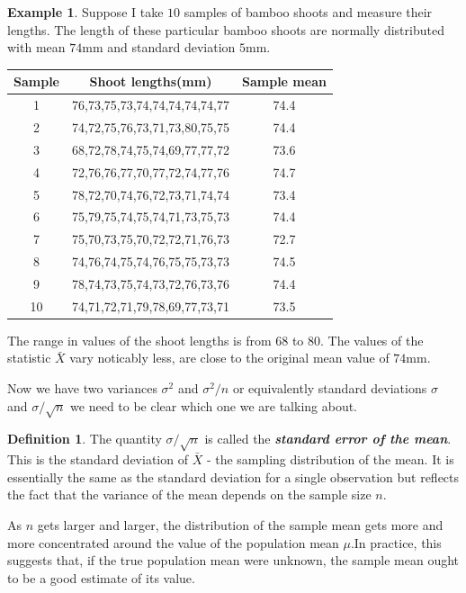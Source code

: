 \documentclass[
]{book}
\theoremstyle{definition}
\newtheorem{definition}{Definition}[chapter]
\theoremstyle{definition}
\newtheorem{example}{Example}[chapter]
\theoremstyle{definition}
\theoremstyle{definition}
\theoremstyle{remark}
\begin{document}
\begin{example}
Suppose I take \(10\) samples of bamboo shoots and measure their lengths. The length of these particular bamboo shoots are normally distributed with mean \(74\)mm and standard deviation \(5\)mm.

\begin{longtable}[]{@{}ccc@{}}
\toprule
Sample & Shoot lengths(mm) & Sample mean\tabularnewline
\midrule
\endhead
1 & 76,73,75,73,74,74,74,74,74,77 & 74.4\tabularnewline
2 & 74,72,75,76,73,71,73,80,75,75 & 74.4\tabularnewline
3 & 68,72,78,74,75,74,69,77,77,72 & 73.6\tabularnewline
4 & 72,76,76,77,70,77,72,74,77,76 & 74.7\tabularnewline
5 & 78,72,70,74,76,72,73,71,74,74 & 73.4\tabularnewline
6 & 75,79,75,74,75,74,71,73,75,73 & 74.4\tabularnewline
7 & 75,70,73,75,70,72,72,71,76,73 & 72.7\tabularnewline
8 & 74,76,74,75,74,76,75,75,73,73 & 74.5\tabularnewline
9 & 78,74,73,75,74,73,72,76,73,76 & 74.4\tabularnewline
10 & 74,71,72,71,79,78,69,77,73,71 & 73.5\tabularnewline
\bottomrule
\end{longtable}

The range in values of the shoot lengths is from \(68\) to \(80\). The values of the statistic \(\bar{X}\) vary noticably less, are close to the original mean value of \(74\)mm.
\end{example}

Now we have two variances \(\sigma^2\) and \(\sigma^2/n\) or equivalently standard deviations \(\sigma\) and \(\sigma / \sqrt{n}\) we need to be clear which one we are talking about.

\begin{definition}
The quantity \(\sigma/\sqrt{n}\) is called the \textbf{\emph{standard error of the
mean}}. This is the standard deviation of \(\bar{X}\) - the sampling distribution of the mean. It is essentially the same as the standard deviation for a single observation but reflects the fact that the variance of
the mean depends on the sample size \(n\).
\end{definition}

As \(n\) gets larger and larger, the distribution of the sample mean
gets more and more concentrated around the value of the population
mean \(\mu\).In practice, this suggests that, if the true
population mean were unknown, the sample mean ought to be a good
estimate of its value.
\end{document}
